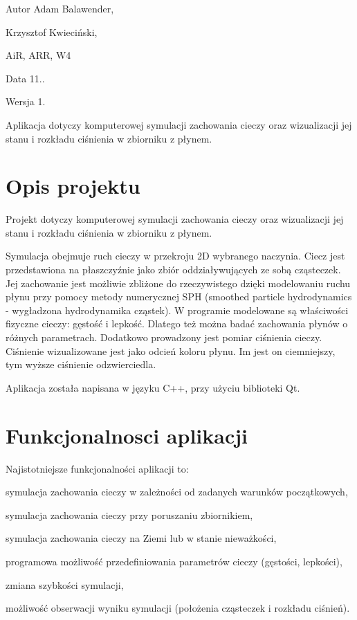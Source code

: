 \begin{DoxyAuthor}{Autor}
Adam Balawender, 

Krzysztof Kwieciński, 

Ai\+R, A\+R\+R, W4 
\end{DoxyAuthor}
\begin{DoxyDate}{Data}
11.. 
\end{DoxyDate}
\begin{DoxyVersion}{Wersja}
1.
\end{DoxyVersion}
Aplikacja dotyczy komputerowej symulacji zachowania cieczy oraz wizualizacji jej stanu i rozkładu ciśnienia w zbiorniku z płynem.\hypertarget{index_etykieta-opis-projektu}{}\section{Opis projektu}\label{index_etykieta-opis-projektu}
Projekt dotyczy komputerowej symulacji zachowania cieczy oraz wizualizacji jej stanu i rozkładu ciśnienia w zbiorniku z płynem.

Symulacja obejmuje ruch cieczy w przekroju 2\+D wybranego naczynia. Ciecz jest przedstawiona na płaszczyźnie jako zbiór oddziaływujących ze sobą cząsteczek. Jej zachowanie jest możliwie zbliżone do rzeczywistego dzięki modelowaniu ruchu płynu przy pomocy metody numerycznej S\+P\+H (smoothed particle hydrodynamics -\/ wygładzona hydrodynamika cząstek). W programie modelowane są właściwości fizyczne cieczy\+: gęstość i lepkość. Dlatego też można badać zachowania płynów o różnych parametrach. Dodatkowo prowadzony jest pomiar ciśnienia cieczy. Ciśnienie wizualizowane jest jako odcień koloru płynu. Im jest on ciemniejszy, tym wyższe ciśnienie odzwierciedla.

Aplikacja została napisana w języku C++, przy użyciu biblioteki Qt.\hypertarget{index_etykieta-funkcjonalnosci-aplikacji}{}\section{Funkcjonalnosci aplikacji}\label{index_etykieta-funkcjonalnosci-aplikacji}
Najistotniejsze funkcjonalności aplikacji to\+:
\begin{DoxyItemize}
\item symulacja zachowania cieczy w zależności od zadanych warunków początkowych,
\item symulacja zachowania cieczy przy poruszaniu zbiornikiem,
\item symulacja zachowania cieczy na Ziemi lub w stanie nieważkości,
\item programowa możliwość przedefiniowania parametrów cieczy (gęstości, lepkości),
\item zmiana szybkości symulacji,
\item możliwość obserwacji wyniku symulacji (położenia cząsteczek i rozkładu ciśnień).
\end{DoxyItemize}

